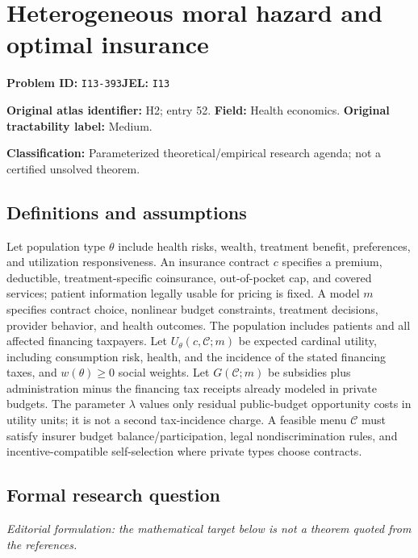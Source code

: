 \documentclass[11pt,a4paper]{article}
\begin{document}
\section*{Heterogeneous moral hazard and optimal insurance}
\textbf{Problem ID:} \texttt{I13-393}\quad \textbf{JEL:} \texttt{I13}\par
\label{problem:OP-0052}
\label{atlas:prob:H2}
\noindent\textbf{Original atlas identifier:} H2; entry 52. \textbf{Field:} Health economics. \textbf{Original tractability label:} Medium.

\noindent\textbf{Classification:} Parameterized theoretical/empirical research agenda; not a certified unsolved theorem.

\subsection*{Definitions and assumptions}
Let population type $\theta$ include health risks, wealth, treatment benefit, preferences, and utilization responsiveness. An insurance contract $c$ specifies a premium, deductible, treatment-specific coinsurance, out-of-pocket cap, and covered services; patient information legally usable for pricing is fixed. A model $m$ specifies contract choice, nonlinear budget constraints, treatment decisions, provider behavior, and health outcomes. The population includes patients and all affected financing taxpayers. Let $U_\theta(c,\mathcal C;m)$ be expected cardinal utility, including consumption risk, health, and the incidence of the stated financing taxes, and $w(\theta)\geq0$ social weights. Let $G(\mathcal C;m)$ be subsidies plus administration minus the financing tax receipts already modeled in private budgets. The parameter $\lambda$ values only residual public-budget opportunity costs in utility units; it is not a second tax-incidence charge. A feasible menu $\mathcal C$ must satisfy insurer budget balance/participation, legal nondiscrimination rules, and incentive-compatible self-selection where private types choose contracts.

\subsection*{Formal research question}
\emph{Editorial formulation: the mathematical target below is not a theorem quoted from the references.}
\end{document}

